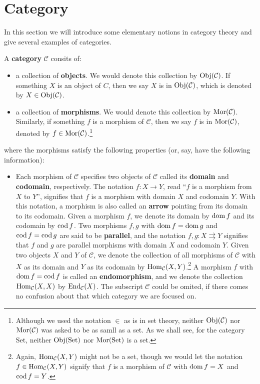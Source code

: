 \section{Category}
In this section we will introduce some elementary notions in category theory and give several examples of categories.
	
	\begin{definition}[Category]
	A \textbf{category} $\mathcal{C}$ consits of:
		\begin{itemize}
			\item a collection of \textbf{objects}. We would denote this collection by $\operatorname{Obj}(\mathcal{C})$. If something $X$ is an object of $C$, then we say $X$ is in $\operatorname{Obj}(\mathcal{C})$, which is denoted by $X\in\operatorname{Obj}(\mathcal{C})$.
			\item a collection of \textbf{morphisms}. We would denote this collection by $\operatorname{Mor}(\mathcal{C})$. Similarly, if something $f$ is a morphism of $\mathcal{C}$, then we say $f$ is in $\operatorname{Mor}(\mathcal{C})$, denoted by $f\in \operatorname{Mor}(\mathcal{C})$.\footnote{Although we used the notation $\in$ as is in set theory, neither $\operatorname{Obj}(\mathcal{C})$ nor $\operatorname{Mor}(\mathcal{C})$ was asked to be as samll as a set. As we shall see, for the category $\mathrm{Set}$, neither $\operatorname{Obj}(\mathrm{Set})$ nor $\operatorname{Mor}(\mathrm{Set})$ is a set.}
		\end{itemize}
	where the morphisms satisfy the following properties (or, say, have the following information):
		\begin{itemize}
			\item Each morphism of $\mathcal{C}$ specifies two objects of $\mathcal{C}$ called its \textbf{domain} and \textbf{codomain}, respectively. The notation $f:X\to Y$, read ``$f$ is a morphism from $X$ to $Y$'', signifies that $f$ is a morphism with domain $X$ and codomain $Y$. With this notation, a morphism is also called an \textbf{arrow} pointing from its domain to its codomain. Given a morphism $f$, we denote its domain by $\operatorname{dom} f$ and its codomain by $\operatorname{cod} f$. Two morphisms $f,g$ with $\operatorname{dom} f=\operatorname{dom} g$ and $\operatorname{cod} f=\operatorname{cod} g$ are said to be \textbf{parallel}, and the notation $f,g:X\rightrightarrows Y$ signifies that $f$ and $g$ are parallel morphisms with domain $X$ and codomain $Y$. Given two objects $X$ and $Y$ of $\mathcal{C}$, we denote the collection of all morphisms of $\mathcal{C}$ with $X$ as its domain and $Y$ as its codomain by $\operatorname{Hom}_\mathcal{C}(X,Y)$.\footnote{Again, $\operatorname{Hom}_\mathcal{C}(X,Y)$ might not be a set, though we would let the notation $f\in\operatorname{Hom}_\mathcal{C}(X,Y)$ signify that $f$ is a morphism of $\mathcal{C}$ with $\operatorname{dom} f=X$ and $\operatorname{cod} f=Y$.} A morphism $f$ with $\operatorname{dom} f=\operatorname{cod} f$ is called an \textbf{endomorphism}, and we denote the collection $\operatorname{Hom}_\mathcal{C}(X,X)$ by $\operatorname{End}_\mathcal{C}(X)$. The subscript $\mathcal{C}$ could be omited, if there comes no confusion about that which category we are focused on.

\end{itemize}
\end{definition}
